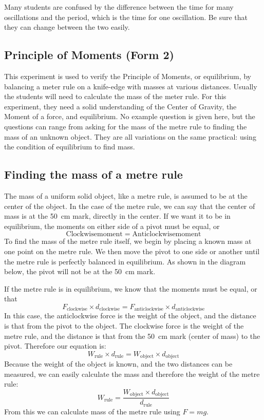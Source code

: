 \documentclass[12pt,a4paper]{report}
\begin{document}
Many students are confused by the difference between the time for many oscillations and
the period, which is the time for one oscillation. Be sure that they can change between
the two easily.

\subsection{Principle of Moments (Form 2)}

This experiment is used to verify the Principle of Moments, or equilibrium, by
balancing a meter rule on a knife-edge with masses at various distances. Usually the
students will need to calculate the mass of the meter rule. For this experiment, they need
a solid understanding of the Center of Gravity, the Moment of a force, and equilibrium.
No example question is given here, but the questions can range from asking for
the mass of the metre rule to finding the mass of an unknown object. They are all
variations on the same practical: using the condition of equilibrium to find mass.

\subsection{Finding the mass of a metre rule}

The mass of a uniform solid object, like a metre rule, is assumed to be at the
center of the object. In the case of the metre rule, we can say that the center of mass is at
the 50~cm mark, directly in the center. If we want it to be in equilibrium, the moments on
either side of a pivot must be equal, or $$ \mathrm{Clockwise moment} = \mathrm{Anticlockwise moment}$$
To find the mass of the metre rule itself, we begin by placing a known mass at one
point on the metre rule. We then move the pivot to one side or another until the metre
rule is perfectly balanced in equilibrium. As shown in the diagram below, the pivot will
not be at the 50~cm mark.

If the metre rule is in equilibrium, we know that the moments must be equal, or
that $$F_{\mathrm{clockwise}} \times d_{\mathrm{clockwise}} = F_{\mathrm{anticlockwise}} \times d_{\mathrm{anticlockwise}}$$
In this case, the anticlockwise force is the weight of the object, and the distance is that
from the pivot to the object. The clockwise force is the weight of the metre rule, and the
distance is that from the 50~cm mark (center of mass) to the pivot. Therefore our
equation is: $$ W_{\mathrm{rule}} \times d_{\mathrm{rule}} = W_{\mathrm{object}} \times d_{\mathrm{object}} $$
Because the weight of the object is known, and the two distances can be measured, we
can easily calculate the mass and therefore the weight of the metre rule:
$$W_{\mathrm{rule}} = \frac{W_{\mathrm{object}} \times d_{\mathrm{object}}}{d_{\mathrm{rule}}}$$
From this we can calculate mass of the metre rule using $F = mg$.
\end{document}
